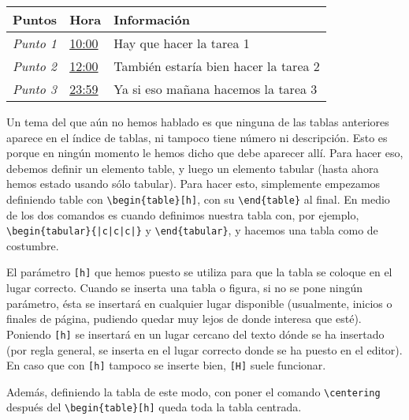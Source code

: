 \begin{center}
	\begin{tabular}{ p{2cm} | p{1cm} | p{10cm} }
		\cellcolor[HTML]{EFEFEF}\textbf{Puntos} & \cellcolor[HTML]{EFEFEF}\textbf{Hora} & \cellcolor[HTML]{EFEFEF}\textbf{Información} \\
		\hline 
		\textit{Punto 1} & \underline{10:00} & Hay que hacer la tarea 1 \\ 
		\hline 
		\textit{Punto 2} & \underline{12:00} &  También estaría bien hacer la tarea 2 \\ 
		\hline 
		\textit{Punto 3} & \underline{23:59} & Ya si eso mañana hacemos la tarea 3 \newline {\scriptsize Ya si eso} \\ 
	\end{tabular} 
\end{center}

Un tema del que aún no hemos hablado es que ninguna de las tablas anteriores aparece en el índice de tablas, ni tampoco tiene número ni descripción. Esto es porque en ningún momento le hemos dicho que debe aparecer allí. Para hacer eso, debemos definir un elemento table, y luego un elemento tabular (hasta ahora hemos estado usando sólo tabular). Para hacer esto, simplemente empezamos definiendo table con \verb!\begin{table}[h]!, con su \verb!\end{table}! al final. En medio de los dos comandos es cuando definimos nuestra tabla con, por ejemplo, \verb!\begin{tabular}{|c|c|c|}! y \verb!\end{tabular}!, y hacemos una tabla como de costumbre.

El parámetro \verb![h]! que hemos puesto se utiliza para que la tabla se coloque en el lugar correcto. Cuando se inserta una tabla o figura, si no se pone ningún parámetro, ésta se insertará en cualquier lugar disponible (usualmente, inicios o finales de página, pudiendo quedar muy lejos de donde interesa que esté). Poniendo \verb![h]! se insertará en un lugar cercano del texto dónde se ha insertado (por regla general, se inserta en el lugar correcto donde se ha puesto en el editor). En caso que con \verb![h]! tampoco se inserte bien, \verb![H]! suele funcionar.

Además, definiendo la tabla de este modo, con poner el comando \verb!\centering! después del \verb!\begin{table}[h]! queda toda la tabla centrada.

